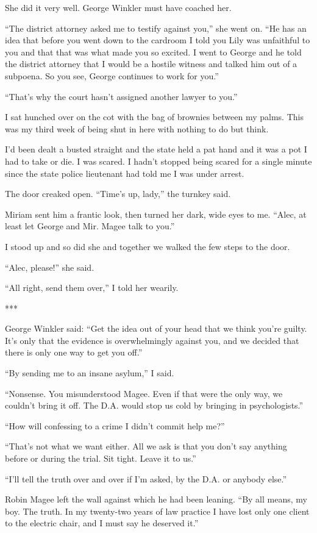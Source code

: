 \documentclass{novel}
\begin{document}
She did it very well. George Winkler must have coached her.

“The district attorney asked me to testify against you,” she went on. “He has an idea that before you went down to the cardroom I told you Lily was unfaithful to you and that that was what made you so excited. I went to George and he told the district attorney that I would be a hostile witness and talked him out of a subpoena. So you see, George continues to work for you.”

“That’s why the court hasn’t assigned another lawyer to you.”

I sat hunched over on the cot with the bag of brownies between my palms. This was my third week of being shut in here with nothing to do but think.

I’d been dealt a busted straight and the state held a pat hand and it was a pot I had to take or die. I was scared. I hadn’t stopped being scared for a single minute since the state police lieutenant had told me I was under arrest.

The door creaked open. “Time’s up, lady,” the turnkey said.

Miriam sent him a frantic look, then turned her dark, wide eyes to me. “Alec, at least let George and Mir. Magee talk to you.”

I stood up and so did she and together we walked the few steps to the door.

“Alec, please!” she said.

“All right, send them over,” I told her wearily.

***

George Winkler said: “Get the idea out of your head that we think you’re guilty. It’s only that the evidence is overwhelmingly against you, and we decided that there is only one way to get you off.”

“By sending me to an insane asylum,” I said.

“Nonsense. You misunderstood Magee. Even if that were the only way, we couldn’t bring it off. The D.A. would stop us cold by bringing in psychologists.”

“How will confessing to a crime I didn’t commit help me?”

“That’s not what we want either. All we ask is that you don’t say anything before or during the trial. Sit tight. Leave it to us.”

“I’ll tell the truth over and over if I’m asked, by the D.A. or anybody else.”

Robin Magee left the wall against which he had been leaning. “By all means, my boy. The truth. In my twenty-two years of law practice I have lost only one client to the electric chair, and I must say he deserved it.”
\end{document}
